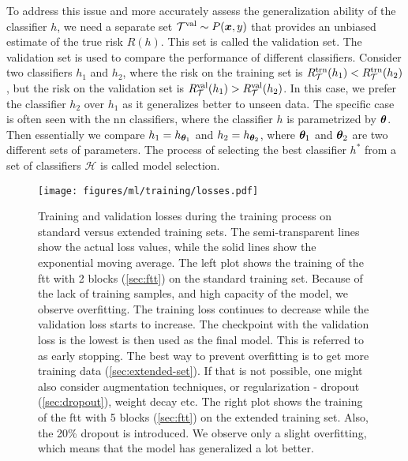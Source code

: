 To address this issue and more accurately assess the generalization ability of the classifier $h$, we need a separate
set $\mathcal{T}^\text{val} \sim P(\bm{x}, y)$ that provides an unbiased estimate of the true risk $R(h)$. This set is called the
validation set. The validation set is used to compare the performance of different classifiers. Consider two classifiers
$h_1$ and $h_2$, where the risk on the training set is $R_\mathcal{T}^\text{trn}(h_1) < R_\mathcal{T}^\text{trn}(h_2)$, but the risk on the validation set
is $R_\mathcal{T}^\text{val}(h_1) > R_\mathcal{T}^\text{val}(h_2)$. In this case, we prefer the classifier $h_2$ over $h_1$ as it generalizes better
to unseen data. The specific case is often seen with the \gls{nn} classifiers, where the classifier $h$ is parametrized
by ${\boldsymbol{\theta}}$. Then essentially we compare $h_1 = h_{{\boldsymbol{\theta}}_1}$ and $h_2 = h_{{\boldsymbol{\theta}}_2}$, where ${\boldsymbol{\theta}}_1$ and
${\boldsymbol{\theta}}_2$ are two different sets of parameters. The process of selecting the best classifier $h^*$ from a set of
classifiers $\mathcal{H}$ is called model selection.

\begin{figure}[htb]
    \centering
    \texttt{[image: figures/ml/training/losses.pdf]}
    \caption[Training and validation losses during the training process on standard versus extended training sets.]
    {Training and validation losses during the training process on standard versus extended training sets.
        The semi-transparent lines show the actual loss values, while the solid lines show the exponential
        moving average.
        The left plot shows the training of the \acrshort{ftt} with 2 blocks (\autoref{sec:ftt}) on the
        standard training set. Because of the lack of training samples, and high capacity of the model, we observe
        overfitting. The training loss continues to decrease while the validation loss starts to increase.
        The checkpoint with the validation loss is the lowest is then used as the final model. This is referred to as early
        stopping.
        The best way to prevent overfitting is to get more training data (\autoref{sec:extended-set}). If that
        is not possible, one might also consider augmentation techniques, or regularization - dropout
        (\autoref{sec:dropout}), weight decay etc. The right plot shows the training of the \acrshort{ftt} with 5 blocks
        (\autoref{sec:ftt}) on the extended training set. Also, the 20\% dropout is introduced. We observe only a
        slight overfitting, which means that the model has generalized a lot better.}
    \label{fig:losses}
\end{figure}

